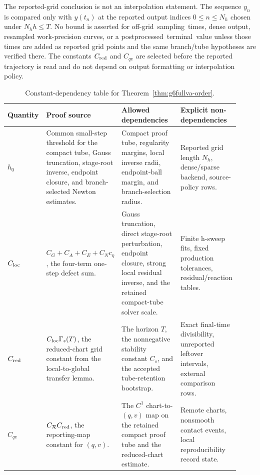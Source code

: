 \documentclass[preprint,12pt]{elsarticle}
\begin{document}
The reported-grid conclusion is not an interpolation statement. The sequence
\(y_n\) is compared only with \(y(t_n)\) at the reported output indices
\(0\le n\le N_h\) chosen under \(N_hh\le T\). No bound is asserted for
\mbox{off-grid sampling times}, dense output, resampled work-precision curves, or a
\mbox{postprocessed terminal value} unless those times are added as reported grid
points and the same branch/tube hypotheses are verified there. The constants
\(C_{\rm red}\) and \(C_{qv}\) are selected before the reported trajectory is
read and do not depend on output formatting or interpolation policy.

\begin{table}[htbp]
\centering
\caption{Constant-dependency table for Theorem~\ref{thm:g6fullva-order}.}
\label{tab:constant-dependency-ledger}
\scriptsize
\setlength{\tabcolsep}{2pt}
\renewcommand{\arraystretch}{0.9}
\begin{tabular}{P{0.17\linewidth}P{0.29\linewidth}P{0.28\linewidth}P{0.18\linewidth}}
\toprule
Quantity & Proof source & Allowed dependencies & Explicit non-dependencies \\
\midrule
\(h_0\) &
Common small-step threshold for the compact tube, Gauss truncation,
stage-root inverse, endpoint closure, and branch-selected Newton estimates. &
Compact proof tube, regularity margins, local inverse radii, endpoint-ball
margin, and branch-selection radius. &
Reported grid length \(N_h\), dense/sparse backend, source-policy rows. \\
\(C_{\rm loc}\) &
\(C_G+C_A+C_E+C_Nc_\eta\), the four-term one-step defect sum. &
Gauss truncation, direct stage-root perturbation, endpoint closure,
strong local residual inverse, and the retained compact-tube solver scale. &
Finite h-sweep fits, fixed production tolerances, residual/reaction tables. \\
\(C_{\rm red}\) &
\(C_{\rm loc}\Gamma_s(T)\), the reduced-chart grid constant from the
local-to-global transfer lemma. &
The horizon \(T\), the nonnegative stability constant \(C_s\), and
the accepted tube-retention bootstrap. &
Exact final-time divisibility, unreported leftover intervals, external
comparison rows. \\
\(C_{qv}\) &
\(C_{\mathcal R}C_{\rm red}\), the reporting-map constant for
\((q,v)\). &
The \(C^1\) chart-to-\((q,v)\) map on the retained compact proof tube and
the reduced-chart estimate. &
Remote charts, nonsmooth contact events, local reproducibility record state. \\
\bottomrule
\end{tabular}
\end{table}
\end{document}
